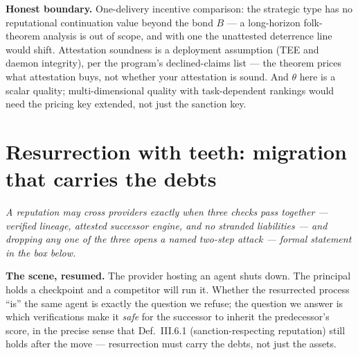 \documentclass[11pt,a4paper]{article}
\newcommand{\onebreath}[1]{\begin{center}\emph{#1}\end{center}}
\begin{document}
\begin{boundary}
\textbf{Honest boundary.} One-delivery incentive comparison: the strategic type has no reputational continuation value beyond the bond $B$
--- a long-horizon folk-theorem analysis is out of scope, and with one the unattested deterrence line would shift. Attestation
soundness is a deployment assumption (TEE and daemon integrity), per the program's declined-claims list --- the theorem prices what
attestation buys, not whether your attestation is sound. And $\theta$ here is a scalar quality; multi-dimensional quality with
task-dependent rankings would need the pricing key extended, not just the sanction key.
\end{boundary}

\section{Resurrection with teeth: migration that carries the debts}\label{sec:resurrection}

\onebreath{A reputation may cross providers exactly when three checks pass together --- verified lineage, attested successor
engine, and no stranded liabilities --- and dropping any one of the three opens a named two-step attack --- formal statement in the
box below.}

\textbf{The scene, resumed.} The provider hosting an agent shuts down. The principal holds a checkpoint and a competitor will run
it. Whether the resurrected process ``is'' the same agent is exactly the question we refuse; the question we answer is which
verifications make it \emph{safe} for the successor to inherit the predecessor's score, in the precise sense that Def.~III.6.1
(sanction-respecting reputation) still holds after the move --- resurrection must carry the debts, not just the assets.
\end{document}
